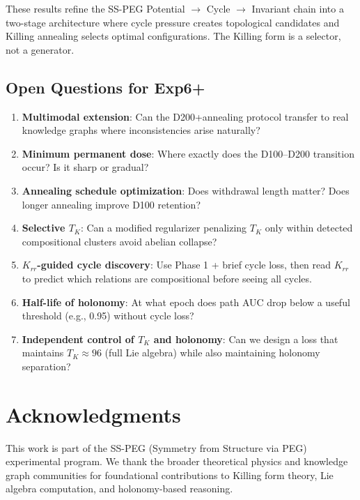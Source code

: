 \documentclass[11pt,letterpaper]{article}
\begin{document}
These results refine the SS-PEG Potential $\to$ Cycle $\to$ Invariant chain into a two-stage architecture where cycle pressure creates topological candidates and Killing annealing selects optimal configurations. The Killing form is a selector, not a generator.

\subsection{Open Questions for Exp6+}

\begin{enumerate}[noitemsep]
\item \textbf{Multimodal extension}: Can the D200+annealing protocol transfer to real knowledge graphs where inconsistencies arise naturally?
\item \textbf{Minimum permanent dose}: Where exactly does the D100--D200 transition occur? Is it sharp or gradual?
\item \textbf{Annealing schedule optimization}: Does withdrawal length matter? Does longer annealing improve D100 retention?
\item \textbf{Selective $T_K$}: Can a modified regularizer penalizing $T_K$ only within detected compositional clusters avoid abelian collapse?
\item \textbf{$K_{rr}$-guided cycle discovery}: Use Phase 1 + brief cycle loss, then read $K_{rr}$ to predict which relations are compositional before seeing all cycles.
\item \textbf{Half-life of holonomy}: At what epoch does path AUC drop below a useful threshold (e.g., 0.95) without cycle loss?
\item \textbf{Independent control of $T_K$ and holonomy}: Can we design a loss that maintains $T_K \approx 96$ (full Lie algebra) while also maintaining holonomy separation?
\end{enumerate}

\section*{Acknowledgments}

This work is part of the SS-PEG (Symmetry from Structure via PEG) experimental program. We thank the broader theoretical physics and knowledge graph communities for foundational contributions to Killing form theory, Lie algebra computation, and holonomy-based reasoning.



\end{document}
